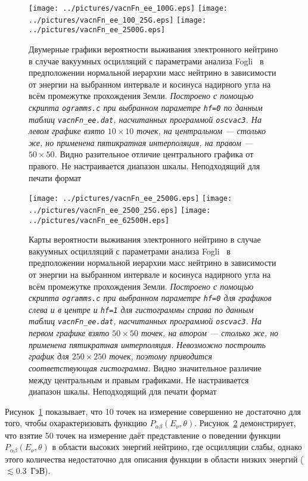 \begin{figure}[!ht]
\texttt{[image: ../pictures/vacnFn\_ee\_100G.eps]}
\texttt{[image: ../pictures/vacnFn\_ee\_100\_25G.eps]}
\texttt{[image: ../pictures/vacnFn\_ee\_2500G.eps]}
\caption{Двумерные графики вероятности выживания электронного нейтрино в случае вакуумных осцилляций с параметрами анализа Fogli~\cite{Fogli:2012ua} в предположении нормальной иерархии масс нейтрино в зависимости от энергии на выбранном интервале и косинуса надирного угла на всём промежутке прохождения Земли. \textit{Построено с помощью скрипта \texttt{ogramms.c} при выбранном параметре \texttt{hf=0} по данным таблиц \texttt{vacnFn\_ee.dat}, насчитанных программой \texttt{oscvac3}. На левом графике взято $10\times10$ точек, на центральном --- столько же, но применена пятикратная интерполяция, на правом --- $50\times50$.} Видно разительное отличие центрального графика от правого. {\color{red}Не настраивается диапазон шкалы.} {\color{magenta}Неподходящий для печати формат}}
\label{vacnFn_ee_10vs50}
\end{figure}
\begin{figure}[!ht]
\vspace*{-0.5cm}
\texttt{[image: ../pictures/vacnFn\_ee\_2500G.eps]}
\texttt{[image: ../pictures/vacnFn\_ee\_2500\_25G.eps]}
\texttt{[image: ../pictures/vacnFn\_ee\_62500H.eps]}
\caption{Карты вероятности выживания электронного нейтрино в случае вакуумных осцилляций с параметрами анализа Fogli~\cite{Fogli:2012ua} в предположении нормальной иерархии масс нейтрино в зависимости от энергии на выбранном интервале и косинуса надирного угла на всём промежутке прохождения Земли. \textit{Построено с помощью скрипта \texttt{ogramms.c} при выбранном параметре \texttt{hf=0} для графиков слева и в центре и \texttt{hf=1} для гистограммы справа по данным таблиц \texttt{vacnFn\_ee.dat}, насчитанных программой \texttt{oscvac3}. На первом графике взято $50\times50$ точек, на втором --- столько же, но применена пятикратная интерполяция. Невозможно построить график для $250\times250$ точек, поэтому приводится соответствующая гистограмма.} Видно значительное различие между центральным и правым графиками. {\color{red}Не настраивается диапазон шкалы.} {\color{magenta}Неподходящий для печати формат}}
\label{vacnFn_ee_50vs250}
\end{figure}

Рисунок~\ref{vacnFn_ee_10vs50} показывает, что 10 точек на измерение совершенно не достаточно для того, чтобы охарактеризовать функцию $P_{\alpha\beta}(E_{\nu},\theta)$. Рисунок~\ref{vacnFn_ee_50vs250} демонстрирует, что взятие 50 точек на измерение даёт представление о поведении функции $P_{\alpha\beta}(E_{\nu},\theta)$ в области высоких энергий нейтрино, где осцилляции слабы, однако этого количества недостаточно для описания функции в области низких энергий ($\lesssim{}0.3$~ГэВ).

